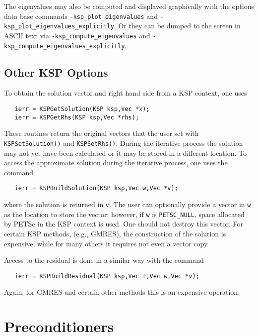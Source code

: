 The eigenvalues may also be computed and displayed graphically with the options 
data base commands {\tt -ksp\_plot\_eigenvalues} and {\tt -ksp\_plot\_eigenvalues\_explicitly}.
 
Or they can be dumped to the screen in ASCII text via
{\tt -ksp\_compute\_eigenvalues} and {\tt -ksp\_compute\_eigenvalues\_explicitly}.
 
   

\subsection{Other KSP Options}

To obtain the solution vector and right hand side from a KSP 
context, one uses  
\begin{verbatim}
   ierr = KSPGetSolution(KSP ksp,Vec *x);
   ierr = KSPGetRhs(KSP ksp,Vec *rhs);
\end{verbatim}
These routines return the original vectors that the user set with 
{\tt KSPSetSolution()} and {\tt KSPSetRhs()}. 
During  the iterative process
the solution may not yet have been calculated or it may be stored in 
a different location. To access the approximate solution during the 
iterative process, one uses the command 
\begin{verbatim}
   ierr = KSPBuildSolution(KSP ksp,Vec w,Vec *v);
\end{verbatim}
where the solution is returned in {\tt v}. The user can optionally provide
a vector in {\tt w} as the location to store the vector; however, if 
{\tt w} is {\tt PETSC\_NULL}, space allocated by PETSc in the KSP context is 
used. One should not destroy this vector. For certain KSP methods, 
(e.g., GMRES), the construction of the solution is expensive, while for many 
others it requires not even a vector copy. 

Access to the residual is done in a similar way with the 
command 
\begin{verbatim}
   ierr = KSPBuildResidual(KSP ksp,Vec t,Vec w,Vec *v);
\end{verbatim}
Again, for GMRES and certain other methods this is an expensive 
operation.

\section{Preconditioners} 
\label{sec:pc}

